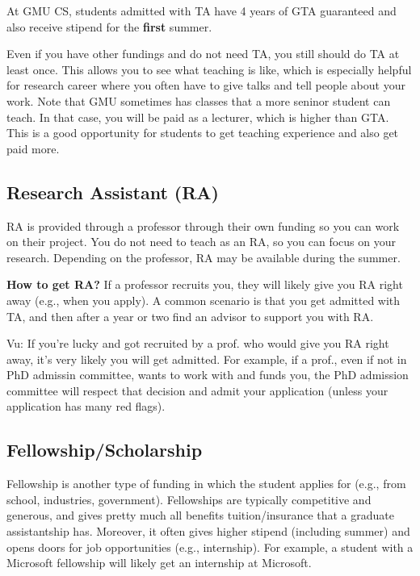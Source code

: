 \documentclass[10pt]{article}
\begin{document}
\begin{tcolorbox}[left=1pt,right=1pt,top=1pt,bottom=1pt]
At GMU CS, students admitted with TA have  4 years of GTA guaranteed and also receive  stipend for the \textbf{first} summer.
\end{tcolorbox}

Even if you have other fundings and do not need TA, you still should do TA at least once.  This allows you to see what teaching is like, which is especially helpful for research career where you often have to give talks and tell people about your work. Note that GMU sometimes has classes that a more seninor student can teach.  In that case, you will be paid as a lecturer, which is higher than GTA.  This is a good opportunity for students to get teaching experience and also get paid more.
\subsection{Research Assistant (RA)}
RA is provided through a professor through their own funding so you can work on their project.  
You do not need to teach as an RA, so you can focus on your research. Depending on the professor, RA may be available during the summer.

\textbf{How to get RA?} If a professor recruits you, they will likely give you RA right away (e.g., when you apply).  A common scenario is that you get admitted with TA, and then after a year or two find an advisor to support you with RA. 


\begin{tcolorbox}[left=1pt,right=1pt,top=1pt,bottom=1pt]
Vu: If you're lucky and got recruited by a prof. who would give you RA right away, it's very likely you will get admitted.  For example, if a prof., even if not in PhD admissin committee, wants to work with and funds you, the PhD admission committee will respect that decision and admit your application (unless your application has many red flags).
\end{tcolorbox}

\subsection{Fellowship/Scholarship}

Fellowship is another type of funding in which the student applies for (e.g., from school, industries, government). Fellowships are typically competitive and generous, and gives pretty much all benefits tuition/insurance that a graduate assistantship has.  Moreover, it often gives higher stipend (including summer) and opens doors for job opportunities (e.g., internship).  For example, a student with a Microsoft fellowship will likely get an internship at Microsoft.  
\end{document}
